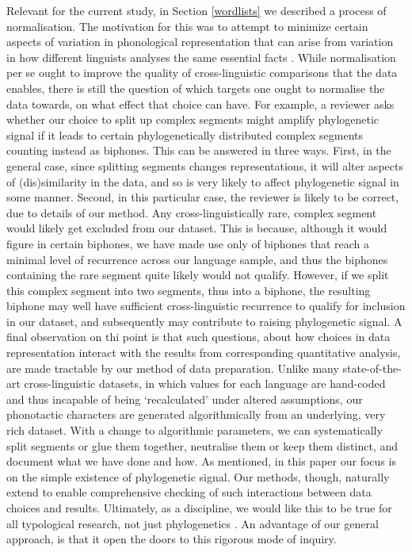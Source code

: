 Relevant for the current study, in Section \ref{wordlists} we described a process of normalisation. The motivation for this was to attempt to minimize certain aspects of variation in phonological representation that can arise from variation in how different linguists analyses the same essential facts \autocites{chao_non-uniqueness_1934}{hockett_problem_1963}{hyman_universals_2008}{dresher_contrastive_2009}. While normalisation per se ought to improve the quality of cross-linguistic comparisons that the data enables, there is still the question of which targets one ought to normalise the data towards, on what effect that choice can have. For example, a reviewer asks whether our choice to split up complex segments might amplify phylogenetic signal if it leads to certain phylogenetically distributed complex segments counting instead as biphones. This can be answered in three ways. First, in the general case, since splitting segments changes representations, it will alter aspects of (dis)similarity in the data, and so is very likely to affect phylogenetic signal in some manner. Second, in this particular case, the reviewer is likely to be correct, due to details of our method. Any cross-linguistically rare, complex segment would likely get excluded from our dataset. This is because, although it would figure in certain biphones, we have made use only of biphones that reach a minimal level of recurrence across our language sample, and thus the biphones containing the rare segment quite likely would not qualify. However, if we split this complex segment into two segments, thus into a biphone, the resulting biphone may well have sufficient cross-linguistic recurrence to qualify for inclusion in our dataset, and subsequently may contribute to raising phylogenetic signal. A final observation on thi point is that such questions, about how choices in data representation interact with the results from corresponding quantitative analysis, are made tractable by our method of data preparation. Unlike many state-of-the-art cross-linguistic datasets, in which values for each language are hand-coded and thus incapable of being `recalculated' under altered assumptions, our phonotactic characters are generated algorithmically from an underlying, very rich dataset. With a change to algorithmic parameters, we can systematically split segments or glue them together, neutralise them or keep them distinct, and document what we have done and how. As mentioned, in this paper our focus is on the simple existence of phylogenetic signal. Our methods, though, naturally extend to enable comprehensive checking of such interactions between data choices and results. Ultimately, as a discipline, we would like this to be true for all typological research, not just phylogenetics \autocite{round_matthew_2017}. An advantage of our general approach, is that it open the doors to this rigorous mode of inquiry.

